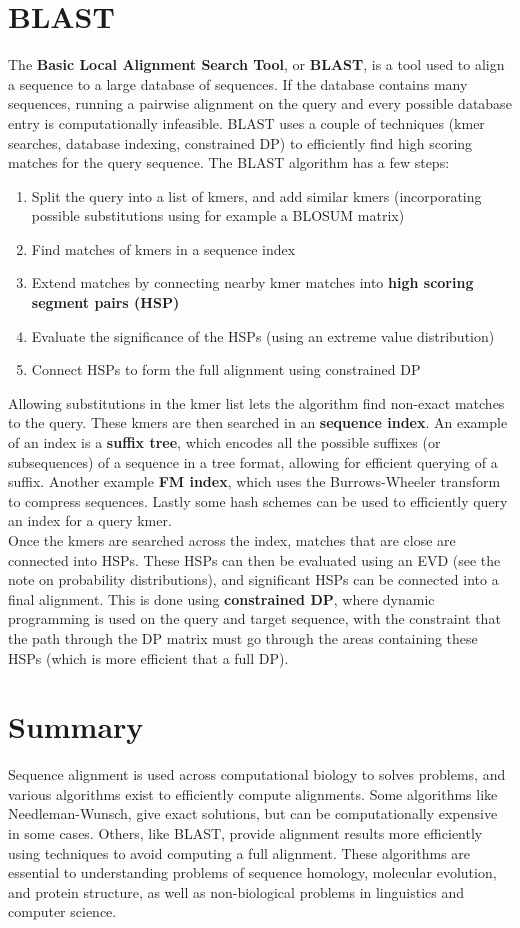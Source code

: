 \documentclass[12pt]{article}
\begin{document}
\section{BLAST}
The \textbf{Basic Local Alignment Search Tool}, or \textbf{BLAST}, is a tool used to align a sequence to a large database of sequences. If the database contains many sequences, running a pairwise alignment on the query and every possible database entry is computationally infeasible. BLAST uses a couple of techniques (kmer searches, database indexing, constrained DP) to efficiently find high scoring matches for the query sequence. The BLAST algorithm has a few steps:
\begin{enumerate}
    \item Split the query into a list of kmers, and add similar kmers (incorporating possible substitutions using for example a BLOSUM matrix)
    \item Find matches of kmers in a sequence index
    \item Extend matches by connecting nearby kmer matches into \textbf{high scoring segment pairs (HSP)}
    \item Evaluate the significance of the HSPs (using an extreme value distribution)
    \item Connect HSPs to form the full alignment using constrained DP
\end{enumerate}
Allowing substitutions in the kmer list lets the algorithm find non-exact matches to the query. These kmers are then searched in an \textbf{sequence index}. An example of an index is a \textbf{suffix tree}, which encodes all the possible suffixes (or subsequences) of a sequence in a tree format, allowing for efficient querying of a suffix. Another example \textbf{FM index}, which uses the Burrows-Wheeler transform to compress sequences. Lastly some hash schemes can be used to efficiently query an index for a query kmer.\\[10pt]
Once the kmers are searched across the index, matches that are close are connected into HSPs. These HSPs can then be evaluated using an EVD (see the note on probability distributions), and significant HSPs can be connected into a final alignment. This is done using \textbf{constrained DP}, where dynamic programming is used on the query and target sequence, with the constraint that the path through the DP matrix must go through the areas containing these HSPs (which is more efficient that a full DP).
\section{Summary}
Sequence alignment is used across computational biology to solves problems, and various algorithms exist to efficiently compute alignments. Some algorithms like Needleman-Wunsch, give exact solutions, but can be computationally expensive in some cases. Others, like BLAST, provide alignment results more efficiently using techniques to avoid computing a full alignment. These algorithms are essential to understanding problems of sequence homology, molecular evolution, and protein structure, as well as non-biological problems in linguistics and computer science.
\end{document}
